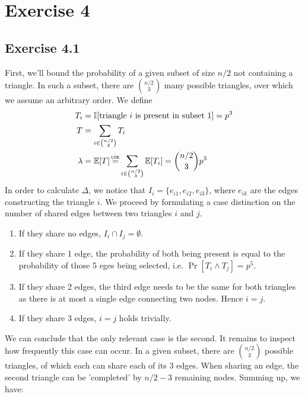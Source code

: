 \documentclass[a4paper,german]{article}
\newcommand\loe{\mathrel{\overset{\makebox[0pt]{\mbox{\normalfont\tiny\sffamily LOE}}}{=}}}
\newcommand{\E}{\mathbb{E}}
\begin{document}
\section*{Exercise 4}
\subsection*{Exercise 4.1}
First, we'll bound the probability of a given subset of size \(n/2\) not containing a triangle. In such a subset, there are \( {n/2 \choose 3}\) many possible triangles, over which we assume an arbitrary order. We define 
\begin{align*} 
T_i &= \mathbb{I} [\text{triangle } i \text{ is present in subset } 1] = p^3 \\
T &= \sum_{i \in {n/2 \choose 3}} T_i \\
\lambda &= \E[T] \loe \sum_{i \in {n/2 \choose 3}} \E[T_i] = {n/2 \choose 3} p^3
\end{align*}
In order to calculate \(\Delta\), we notice that \(I_i = \{e_{i1}, e_{i2}, e_{i3} \}\), where \(e_{ik}\) are the edges constructing the triangle \(i\). We proceed by formulating a case distinction on the number of shared edges between two triangles \(i\) and \(j\).
\begin{enumerate}
\item If  they share no edges, \(I_i \cap I_j = \emptyset \).
\item If they share 1 edge, the probability of both being present is equal to the probability of those 5 eges being selected, i.e. \(\Pr[T_i \wedge T_j] = p^5\).
\item If they share 2 edges, the third edge needs to be the same for both triangles as there is at most a single edge connecting two nodes. Hence \(i = j\).
\item If they share 3 edges, \(i = j\) holds trivially. 
\end{enumerate}
We can conclude that the only relevant case is the second. It remains to inspect how frequently this case can occur. In a given subset, there are \( {n/2 \choose 3} \) possible triangles, of which each can share each of its 3 edges. When sharing an edge, the second triangle can be 'completed' by \(n/2 -3\) remaining nodes. Summing up, we have:
\end{document}
